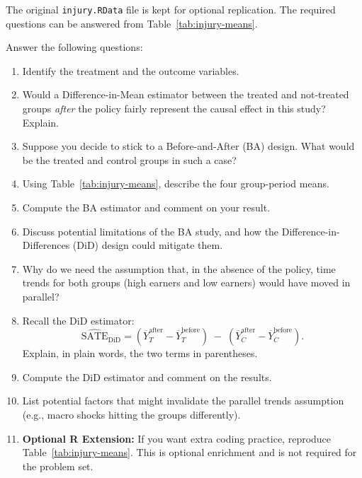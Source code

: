 \documentclass[12pt]{article}
\begin{document}
The original \texttt{injury.RData} file is kept for optional replication. The required questions can be answered from Table~\ref{tab:injury-means}.

Answer the following questions:
\begin{enumerate}
  \item Identify the treatment and the outcome variables.
  \item Would a Difference-in-Mean estimator between the treated and not-treated groups \emph{after} the policy fairly represent the causal effect in this study? Explain.
  \item Suppose you decide to stick to a Before-and-After (BA) design. What would be the treated and control groups in such a case?
  \item Using Table~\ref{tab:injury-means}, describe the four group-period means.
  \item Compute the BA estimator and comment on your result.
  \item Discuss potential limitations of the BA study, and how the Difference-in-Differences (DiD) design could mitigate them.
  \item Why do we need the assumption that, in the absence of the policy, time trends for both groups (high earners and low earners) would have moved in parallel?
  \item Recall the DiD estimator:
  \[
     \widehat{\mathrm{SATE}}_{\mathrm{DiD}} 
       = (\overline{Y}_T^{\mathrm{after}} - \overline{Y}_T^{\mathrm{before}}) 
         \;-\; 
         (\overline{Y}_C^{\mathrm{after}} - \overline{Y}_C^{\mathrm{before}}).
  \]
  Explain, in plain words, the two terms in parentheses.
  \item Compute the DiD estimator and comment on the results.
  \item List potential factors that might invalidate the parallel trends assumption (e.g., macro shocks hitting the groups differently).
  \item \textbf{Optional R Extension:} If you want extra coding practice, reproduce Table~\ref{tab:injury-means}. This is optional enrichment and is not required for the problem set.
\end{enumerate}
\end{document}
